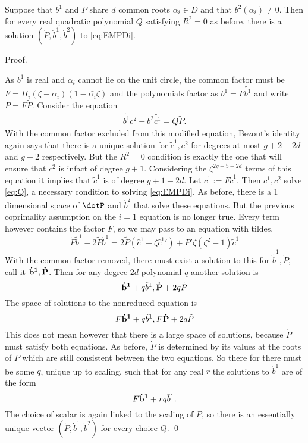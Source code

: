 \begin{lem}[$b^1$ and $P$]
Suppose that $b^1$ and $P$ share $d$ common roots $α_i\in D$ and that $b^2(α_i)\neq 0$. Then for every real quadratic polynomial $Q$ satisfying $R^2=0$ as before, there is a solution $(\dot P, \dot b^1, \dot b^2)$ to \eqref{eq:EMPDi}.
\end{lem}

Proof.

As $b^1$ is real and $α_i$ cannot lie on the unit circle, the common factor must be $F=\Pi_i (ζ-α_i)(1-\bar{α_i}ζ)$ and the polynomials factor as $b^1 = F\tilde{b^1}$ and write $P = F\tilde{P}$. Consider the equation
\begin{align}
\tilde{b^1}c^2 - b^2\tilde{c^1} = Q\tilde{P}.
\end{align}
With the common factor excluded from this modified equation, Bezout's identity again says that there is a unique solution for $\tilde{c}^1,c^2$ for degrees at most $g+2-2d$ and $g+2$ respectively. But the $R^2=0$ condition is exactly the one that will ensure that $c^2$ is infact of degree $g+1$. Considering the $ζ^{2g+5-2d}$ terms of this equation it implies that $\tilde{c}^1$ is of degree $g+1-2d$. Let $c^1 :=  F\tilde{c}^1$. Then $c^1, c^2$ solve \eqref{eq:Q}, a necessary condition to solving \eqref{eq:EMPDi}. As before, there is a 1 dimensional space of $\dotP $ and $\dot b^2$ that solve these equations. But the previous coprimality assumption on the $i=1$ equation is no longer true. Every term however contains the factor $F$, so we may pass to an equation with tildes.
\[
\dot P \tilde b^1 - 2\tilde P \dot b^1 = 2\tilde P\left(\hat c^1 - ζ{\hat {c}^1}'\right) + P'ζ(ζ^2-1)\tilde c^1
\]
With the common factor removed, there must exist a solution to this for $\dot {\tilde{b}}^1, \dot {\tilde{P}}$, call it ${\bf\dot b^1}, {\bf\dot P}$. Then for any degree $2d$ polynomial $q$ another solution is
\[
{\bf\dot b^1} + q \tilde b^1, {\bf\dot P} + 2q \tilde P
\]
The space of solutions to the nonreduced equation is
\[
F{\bf\dot b^1} + q \tilde b^1, F{\bf\dot P} + 2q \tilde P
\]
This does not mean however that there is a large space of solutions, because $\dot P$ must satisfy both equations. As before, $\dot P$ is determined by its values at the roots of $P$ which are still consistent between the two equations. So there for there must be some $q$, unique up to scaling, such that for any real $r$ the solutions to $\dot b^1$ are of the form
\[
F{\bf\dot b^1} + rq \tilde b^1.
\]
The choice of scalar is again linked to the scaling of $P$, so there is an essentially unique vector $(\dot P, \dot b^1, \dot b^2)$ for every choice $Q$.
\qed











